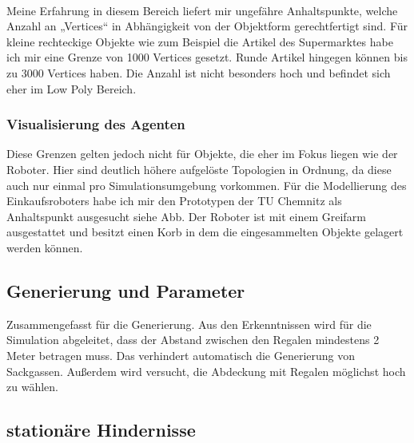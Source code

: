 \\
Meine Erfahrung in diesem Bereich liefert mir ungefähre Anhaltspunkte, welche Anzahl an „Vertices“ in Abhängigkeit von der Objektform gerechtfertigt sind. Für kleine rechteckige Objekte wie zum Beispiel die Artikel des Supermarktes habe ich mir eine Grenze von 1000 Vertices gesetzt. Runde Artikel hingegen können bis zu 3000 Vertices haben. Die Anzahl ist nicht besonders hoch und befindet sich eher im Low Poly Bereich.

\subsubsection{Visualisierung des Agenten}
\label{vis_agent}
Diese Grenzen gelten jedoch nicht für Objekte, die eher im Fokus liegen wie der Roboter. Hier sind deutlich höhere aufgelöste Topologien in Ordnung, da diese auch nur einmal pro Simulationsumgebung vorkommen. Für die Modellierung des Einkaufsroboters habe ich mir den Prototypen der TU Chemnitz als Anhaltspunkt ausgesucht siehe Abb. Der Roboter ist mit einem Greifarm ausgestattet und besitzt einen Korb in dem die eingesammelten Objekte gelagert werden können. 

\subsection{Generierung und Parameter}
Zusammengefasst für die Generierung. Aus den Erkenntnissen wird für die Simulation abgeleitet, dass der Abstand zwischen den Regalen mindestens 2 Meter betragen muss. Das verhindert automatisch die Generierung von Sackgassen. Außerdem wird versucht, die Abdeckung mit Regalen möglichst hoch zu wählen. 
\subsection{stationäre Hindernisse}
